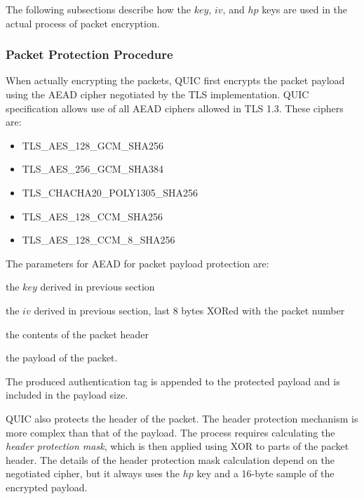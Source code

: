 The following subsections describe how the $key$, $iv$, and $hp$ keys are used in the actual process
of packet encryption.

\subsubsection{Packet Protection Procedure}

When actually encrypting the packets, QUIC first encrypts the packet payload using the AEAD cipher
negotiated by the TLS implementation. QUIC specification allows use of all AEAD ciphers allowed in
TLS 1.3. These ciphers are:

\begin{itemize}

  \item TLS\_AES\_128\_GCM\_SHA256

  \item TLS\_AES\_256\_GCM\_SHA384

  \item TLS\_CHACHA20\_POLY1305\_SHA256

  \item TLS\_AES\_128\_CCM\_SHA256

  \item TLS\_AES\_128\_CCM\_8\_SHA256

\end{itemize}


The parameters for AEAD for packet payload protection are:

\begin{itemize}

     the $key$ derived in previous section

     the $iv$ derived in previous section, last 8 bytes XORed with the packet number

     the contents of the packet header

     the payload of the packet.

\end{itemize}

The produced authentication tag is appended to the protected payload and is included in the payload
size.

QUIC also protects the header of the packet. The header protection mechanism is more complex than
that of the payload. The process requires calculating the \textit{header protection mask}, which is
then applied using XOR to parts of the packet header. The details of the header protection mask
calculation depend on the negotiated cipher, but it always uses the $hp$ key and a 16-byte sample of
the encrypted payload.

